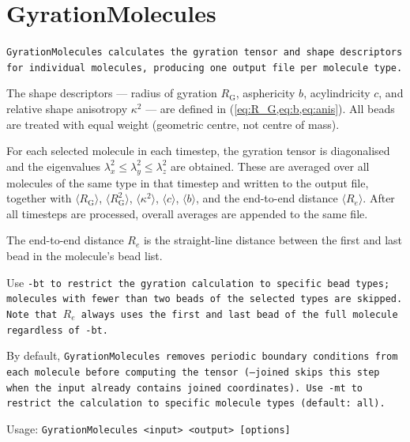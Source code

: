 \section{GyrationMolecules} \label{sec:GyrationMolecules}

\tt{GyrationMolecules} calculates the gyration tensor and shape descriptors for
individual molecules, producing one output file per molecule type.

The shape descriptors --- radius of gyration $R_\mathrm{G}$, asphericity $b$,
acylindricity $c$, and relative shape anisotropy $\kappa^2$ --- are defined in
 (\cref{eq:R_G,eq:b,eq:anis}). All beads are
treated with equal weight (geometric centre, not centre of mass).

For each selected molecule in each timestep, the gyration tensor is diagonalised
and the eigenvalues $\lambda_x^2 \leq \lambda_y^2 \leq \lambda_z^2$ are
obtained. These are averaged over all molecules of the same type in that
timestep and written to the output file, together with $\langle R_\mathrm{G}
\rangle$, $\langle R_\mathrm{G}^2 \rangle$, $\langle \kappa^2 \rangle$,
$\langle c \rangle$, $\langle b \rangle$, and the end-to-end distance $\langle
R_e \rangle$. After all timesteps are processed, overall averages are appended
to the same file.

The end-to-end distance $R_e$ is the straight-line distance between the first
and last bead in the molecule's bead list.

Use \tt{-bt} to restrict the gyration calculation to specific bead types;
molecules with fewer than two beads of the selected types are skipped.
Note that $R_e$ always uses the first and last bead of the full molecule
regardless of \tt{-bt}.

By default, \tt{GyrationMolecules} removes periodic boundary conditions from
each molecule before computing the tensor (\tt{--joined} skips this step when
the input already contains joined coordinates). Use \tt{-mt} to restrict the
calculation to specific molecule types (default: all).

\vspace{1em}
\noindent
Usage: \tt{GyrationMolecules <input> <output> [options]}

